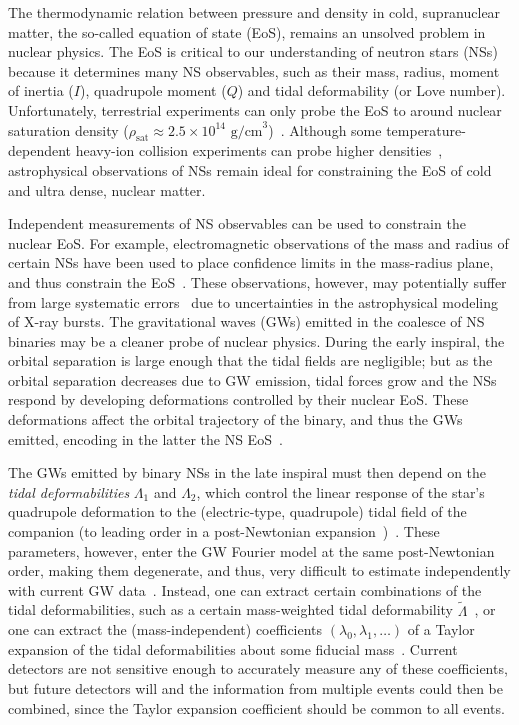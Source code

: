 \documentclass[prd,twocolumn,nofootinbib,superscriptaddress,amsmath,amssymb]{revtex4-1}
\begin{document}
The thermodynamic relation between pressure and density in cold, supranuclear matter, the so-called equation of state (EoS), remains an unsolved problem in nuclear physics. The EoS is critical to our understanding of neutron stars (NSs) because it determines many NS observables, such as their mass, radius, moment of inertia ($I$), quadrupole moment ($Q$) and tidal deformability (or Love number). Unfortunately, terrestrial experiments can only probe the EoS to around nuclear saturation density ($\rho_{\text{sat}} \approx 2.5 \times 10^{14} \text{ g/cm}^3$)~\cite{Li:HeavyIon,Tsang:SymmetryEnergy,Centelles:NeutronSkin,Li:CrossSections,Chen:SymEnergy}. Although some temperature-dependent heavy-ion collision experiments can probe higher densities~\cite{Danielewicz:2002pu}, astrophysical observations of NSs remain ideal for constraining the EoS of cold and ultra dense, nuclear matter.

Independent measurements of NS observables can be used to constrain the nuclear EoS. For example, electromagnetic observations of the mass and radius of certain NSs have been used to place confidence limits in the mass-radius plane, and thus constrain the EoS~\cite{guver,ozel-baym-guver,steiner-lattimer-brown,Lattimer2014,Ozel:2016oaf}. These observations, however, may potentially suffer from large systematic errors~\cite{Miller2013} due to uncertainties in the astrophysical modeling of X-ray bursts. The gravitational waves (GWs) emitted in the coalesce of NS binaries may be a cleaner probe of nuclear physics. During the early inspiral, the orbital separation is large enough that the tidal fields are negligible; but as the orbital separation decreases due to GW emission, tidal forces grow and the NSs respond by developing deformations controlled by their nuclear EoS. These deformations affect the orbital trajectory of the binary, and thus the GWs emitted, encoding in the latter the NS EoS~\cite{hinderer-love,Flanagan2008}.

The GWs emitted by binary NSs in the late inspiral must then depend on the \emph{tidal deformabilities} $\Lambda_1$ and $\Lambda_2$, which control the linear response of the star's quadrupole deformation to the (electric-type, quadrupole) tidal field of the companion (to leading order in a post-Newtonian expansion~\cite{Blanchet:2013haa})~\cite{Flanagan2008,Vines:2011ud}. These parameters, however, enter the GW Fourier model at the same post-Newtonian order, making them degenerate, and thus, very difficult to estimate independently with current GW data~\cite{Wade:tidalCorrections}. Instead, one can extract certain combinations of the tidal deformabilities, such as a certain mass-weighted tidal deformability $\tilde{\Lambda}$~\cite{Favata:2013rwa,Wade:tidalCorrections}, or one can extract the (mass-independent) coefficients $(\lambda_{0},\lambda_{1},\ldots)$ of a Taylor expansion of the tidal deformabilities about some fiducial mass~\cite{Messenger:2011gi,delPozzo:TaylorTidal,Yagi:binLove}. Current detectors are not sensitive enough to accurately measure any of these coefficients, but future detectors will and the information from multiple events could then be combined, since the Taylor expansion coefficient should be common to all events. 
\end{document}
